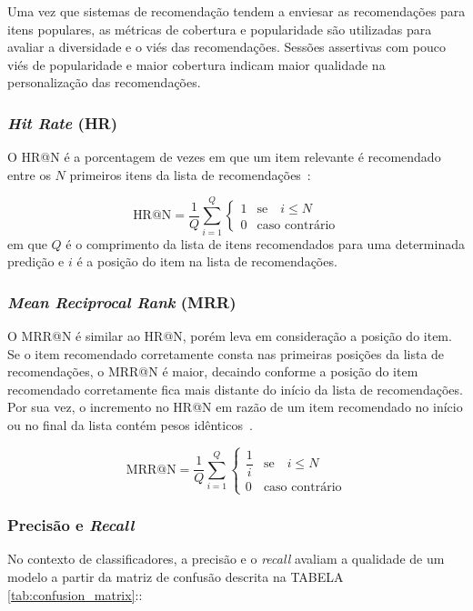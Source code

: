   Uma vez que sistemas de recomendação tendem a enviesar as recomendações para
  itens populares, as métricas de cobertura e popularidade são utilizadas para
  avaliar a diversidade e o viés das recomendações. Sessões assertivas com pouco
  viés de popularidade e maior cobertura indicam maior qualidade na
  personalização das recomendações.

  \subsubsection{\textit{Hit Rate} (HR)}
  O HR@N é a porcentagem de vezes em que um item relevante
  é recomendado entre os $N$ primeiros itens da lista de recomendações~\cite{sessionbaseddp}:

  \begin{equation}
    \text{HR@N} = \frac{1}{Q}\sum_{i=1}^{Q}\begin{cases}
      1 & \text{se} \quad i \leq N \\
      0 & \text{caso contrário}
    \end{cases}
  \end{equation}
  em que $Q$ é o comprimento da lista de itens recomendados para uma determinada
  predição e $i$ é a posição do item na lista de recomendações.
  \subsubsection{\textit{Mean Reciprocal Rank} (MRR)} O MRR@N é similar ao HR@N,
  porém leva em consideração a posição do item. Se o item recomendado
  corretamente consta nas primeiras posições da lista de recomendações, o MRR@N
  é maior, decaindo conforme a posição do item recomendado corretamente fica
  mais distante do início da lista de recomendações. Por sua vez, o incremento
  no HR@N em razão de um item recomendado no início ou no final da lista contém
  pesos idênticos~\cite{sessionbaseddp}.

  \begin{equation}
    \text{MRR@N} = \frac{1}{Q}\sum_{i=1}^{Q}\begin{cases}
      \dfrac{1}{i} & \text{se} \quad i \leq N \\
      0 & \text{caso contrário}
    \end{cases}
  \end{equation}

  \subsubsection{Precisão e \textit{Recall}}
  No contexto de classificadores, a precisão e o \textit{recall} avaliam
  a qualidade de um modelo a partir da matriz de confusão descrita
  na TABELA \ref{tab:confusion_matrix}::

